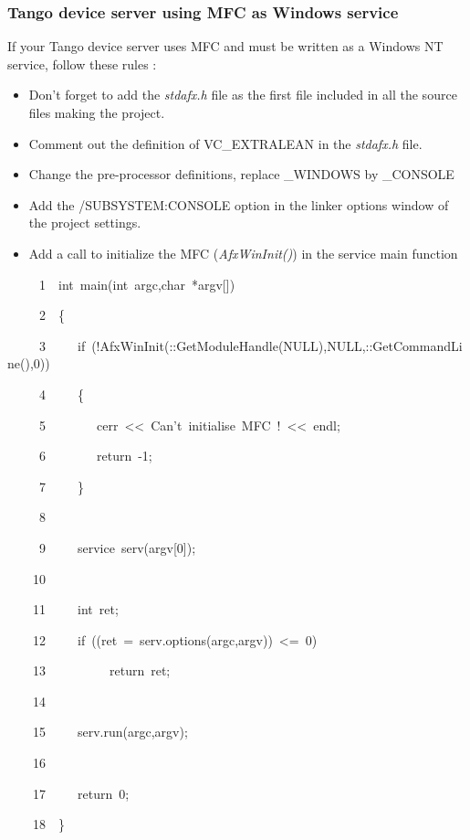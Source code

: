 \subsubsection{Tango device server using MFC as Windows service}

If your Tango device server uses MFC and must be written
as a Windows NT service, follow these rules :
\begin{itemize}
\item Don't forget to add the \emph{stdafx.h} file as the first file included
in all the source files making the project.
\item Comment out the definition of VC\_EXTRALEAN in the \emph{stdafx.h}
file.
\item Change the pre-processor definitions, replace \_WINDOWS by \_CONSOLE
\item Add the /SUBSYSTEM:CONSOLE option in the linker options window of
the project settings.
\item Add a call to initialize the MFC (\emph{AfxWinInit()}) in the service
main function
\end{itemize}

\begin{lyxcode}
~~~~~1~~int~main(int~argc,char~{*}argv{[}{]})

~~~~~2~~\{

~~~~~3~~~~~if~(!AfxWinInit(::GetModuleHandle(NULL),NULL,::GetCommandLine(),0))

~~~~~4~~~~~\{

~~~~~5~~~~~~~~cerr~<\textcompwordmark{}<~\textquotedbl{}Can't~initialise~MFC~!\textquotedbl{}~<\textcompwordmark{}<~endl;

~~~~~6~~~~~~~~return~-1;

~~~~~7~~~~~\}

~~~~~8~~

~~~~~9~~~~~service~serv(argv{[}0{]});

~~~~10~~

~~~~11~~~~~int~ret;

~~~~12~~~~~if~((ret~=~serv.options(argc,argv))~<=~0)

~~~~13~~~~~~~~~~return~ret;

~~~~14~~

~~~~15~~~~~serv.run(argc,argv);

~~~~16~~

~~~~17~~~~~return~0;

~~~~18~~\}
\end{lyxcode}


